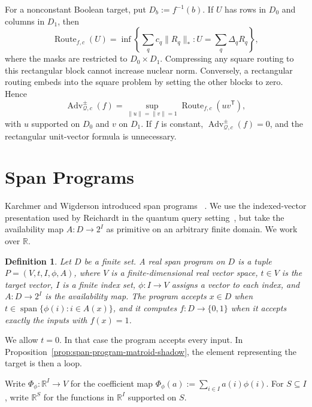 \documentclass[11pt]{article}
\numberwithin{equation}{section}
\newtheorem{definition}{Definition}[section]
\theoremstyle{remark}
\begin{document}
For a nonconstant Boolean target, put $D_b:=f^{-1}(b)$. If $U$ has rows in $D_0$ and
columns in $D_1$, then
\begin{equation}
\label{eq:boolean-rectangular-routing}
    \operatorname{Route}_{f,c}(U)=\inf\left\{\sum_qc_q\|R_q\|_*:U=\sum_q\Delta_qR_q\right\},
\end{equation}
where the masks are restricted to $D_0\times D_1$.  Compressing any square
routing to this rectangular block cannot increase nuclear norm.  Conversely,
a rectangular routing embeds into the square problem by setting the other
blocks to zero.  Hence
\begin{equation}
    \operatorname{Adv}^{\pm}_{\mathcal Q,c}(f)=\sup_{\|u\|=\|v\|=1}\operatorname{Route}_{f,c}(uv^{\mathsf T}),
\end{equation}
with $u$ supported on $D_0$ and $v$ on $D_1$. If $f$ is constant,
$\operatorname{Adv}^{\pm}_{\mathcal Q,c}(f)=0$, and the rectangular
unit-vector formula is unnecessary.

\section{Span Programs}
\label{sec:span-programs}

Karchmer and Wigderson introduced span programs
~\cite{KarchmerWigderson1993}. We use the indexed-vector presentation used
by Reichardt in the quantum query setting~\cite{Reichardt2009}, but take the
availability map $A:D\to2^I$ as primitive on an arbitrary finite domain.
We work over $\mathbb R$.

\begin{definition}
\label{def:span-program}
Let $D$ be a finite set. A \emph{real span program on $D$} is a tuple $P=(V,t,I,\phi,A)$, where $V$ is a finite-dimensional real vector space, $t\in V$ is the target vector, $I$ is a finite index set, $\phi:I\to V$ assigns a vector to each index, and $A:D\to 2^I$ is the availability map. The program accepts $x\in D$ when $t\in\operatorname{span}\{\phi(i):i\in A(x)\}$, and it computes $f:D\to\{0,1\}$ when it accepts exactly the inputs with $f(x)=1$.
\end{definition}

We allow $t=0$. In that case the program accepts every input. In
Proposition~\ref{prop:span-program-matroid-shadow}, the element representing
the target is then a loop.

Write $\Phi_\phi:\mathbb R^I\to V$ for the coefficient map $\Phi_\phi(a):=\sum_{i\in I}a(i)\phi(i)$. For $S\subseteq I$, write $\mathbb R^S$ for the functions in $\mathbb R^I$ supported on $S$.
\end{document}
